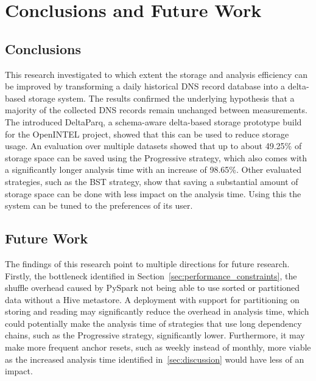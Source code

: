 \section{Conclusions and Future Work}

\subsection{Conclusions}
This research investigated to which extent the storage and analysis efficiency can be improved by transforming a daily
historical DNS record database into a delta-based storage system. The results confirmed the underlying hypothesis that 
a majority of the collected DNS records remain unchanged between measurements. The introduced DeltaParq, a schema-aware 
delta-based storage prototype build for the OpenINTEL project, showed that this can be used to reduce storage usage.
An evaluation over multiple datasets showed that up to about 49.25\% of storage space can be saved using the 
Progressive strategy, which also comes with a significantly longer analysis time with an increase of 98.65\%. Other evaluated strategies, 
such as the BST strategy, show that saving a substantial amount of storage space can be done with less impact 
on the analysis time. Using this the system can be tuned to the preferences of its user.


\subsection{Future Work}

The findings of this research point to multiple directions for future research. Firstly, the bottleneck identified in Section~\ref{sec:performance_constraints}, 
the shuffle overhead caused by PySpark not being able to use sorted or partitioned data without a Hive metastore. A deployment with support for partitioning on storing and reading may significantly 
reduce the overhead in analysis time, which could potentially make the analysis time of strategies that use long dependency chains, such as 
the Progressive strategy, significantly lower. Furthermore, it may make more frequent anchor resets, such as weekly instead of monthly, 
more viable as the increased analysis time identified in~\ref{sec:discussion} would have less of an impact.

